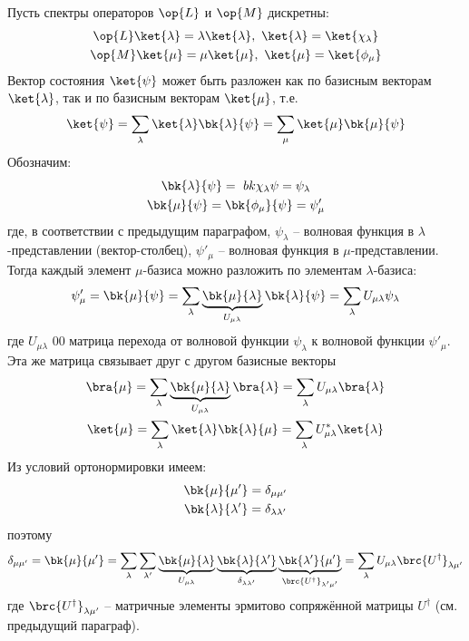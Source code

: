 Пусть спектры операторов $\op{L}$ и $\op{M}$ дискретны:
$$
\begin{gathered}
\op{L}\ket{\lambda} = \lambda\ket{\lambda},~ \ket{\lambda}=\ket{\chi_\lambda} \\
\op{M}\ket{\mu} = \mu\ket{\mu},~ \ket{\mu}=\ket{\phi_\mu}
\end{gathered}
$$%
%
Вектор состояния $\ket{\psi}$ может быть разложен как по базисным векторам $\ket{\lambda}$, так и по базисным векторам $\ket{\mu}$, т.е.%
%
$$
\ket{\psi}=\sum_\lambda \ket{\lambda}\bk{\lambda}{\psi}=\sum_\mu \ket{\mu}\bk{\mu}{\psi}
$$%
%
Обозначим:%
$$
\begin{gathered}
\bk{\lambda}{\psi} =\ bk{\chi_\lambda}{\psi}= \psi_\lambda \\
\bk{\mu}{\psi}=\bk{\phi_\mu}{\psi}=\psi'_\mu
\end{gathered}
$$%
%
где, в соответствии с предыдущим параграфом, $\psi_\lambda$ -- волновая функция в $\lambda$-представлении (вектор-столбец), $\psi'_\mu$ -- волновая функция в $\mu$-представлении. Тогда каждый элемент $\mu$-базиса можно разложить по элементам $\lambda$-базиса:%
%
\begin{equation}
\label{eq:6_2_1}
\psi'_\mu = \bk{\mu}{\psi} =
	\sum_\lambda \underbrace{\bk{\mu}{\lambda}}_{U_{\mu\lambda}}\bk{\lambda}{\psi} =
	\sum_\lambda U_{\mu\lambda}\psi_\lambda
\end{equation}%
%
где $U_{\mu\lambda}$ 00 матрица перехода от волновой функции $\psi_\lambda$ к волновой функции $\psi'_\mu$. Эта же матрица связывает друг с другом базисные векторы%
%
$$
\begin{gathered}
\bra{\mu}=\sum_\lambda \underbrace{\bk{\mu}{\lambda}}_{U_{\mu\lambda}} \bra{\lambda} = \sum_\lambda U_{\mu\lambda}\bra{\lambda} \\
\ket{\mu}=\sum_\lambda \ket{\lambda} \bk{\lambda}{\mu} = \sum_\lambda U^*_{\mu\lambda}\ket{\lambda} 
\end{gathered}
$$%
%
Из условий ортонормировки имеем:
$$
\begin{gathered}
\bk{\mu}{\mu'}=\delta_{\mu\mu'}\\
\bk{\lambda}{\lambda'}=\delta_{\lambda\lambda'}
\end{gathered}
$$%
%
поэтому
$$
\delta_{\mu\mu'} = \bk{\mu}{\mu'} =
	\sum_\lambda \sum_{\lambda'} \underbrace{\bk{\mu}{\lambda}}_{U_{\mu\lambda}}
		\underbrace{\bk{\lambda}{\lambda'}}_{\delta_{\lambda\lambda'}}
		\underbrace{\bk{\lambda'}{\mu'}}_{\brc{U^\dag}_{\lambda'\mu'}} =
	\sum_\lambda U_{\mu\lambda}\brc{U^\dag}_{\lambda\mu'}
$$%
%
где $\brc{U^\dag}_{\lambda\mu'}$ -- матричные элементы эрмитово сопряжённой матрицы $U^\dag$ (см. предыдущий параграф).

